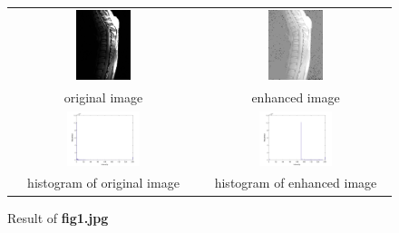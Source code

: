 \documentclass[11pt,a4paper]{article}
\begin{document}
\begin{figure}[!htbp]
	\centering
	\begin{tabular}{cc} 
		\includegraphics[width=0.3\textwidth]{pro1/fig1_origin}&
		\includegraphics[width=0.3\textwidth]{pro1/fig1_enhanced} \\
		original image & enhanced image\\
		\includegraphics[width=0.4\textwidth]{pro1/fig1_originhist} &
		\includegraphics[width=0.4\textwidth]{pro1/fig1_enhancehist}\\
		histogram of original image & histogram of enhanced image
	\end{tabular}
	\caption{Result of \textbf{fig1.jpg}}
	\label{pro1_fig1}
\end{figure}
\end{document}
